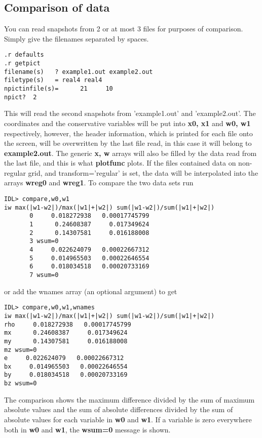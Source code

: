 \subsection{Comparison of data \label{s-compare}}

   You can read snapshots from 2 or at most 3 files for purposes of
   comparison. Simply give the filenames separated by spaces.
\begin{verbatim}
.r defaults
.r getpict
filename(s)   ? example1.out example2.out
filetype(s)   = real4 real4
npictinfile(s)=      21     10
npict?  2
\end{verbatim}
   This will read the second snapshots from 'example1.out' and
   'example2.out'. The coordinates and the conservative variables 
   will be put into {\bf x0, x1} and {\bf w0, w1} respectively, however, 
   the header information, which is printed for each file onto the screen, 
   will be overwritten by the last file read, in this case it will belong to
   {\bf example2.out}. The generic {\bf x, w} arrays will also be
   filled by the data read from the last file, and this is what 
   {\bf plotfunc} plots. If the files contained data on non-regular grid,
   and transform='regular' is set, the data will be interpolated into 
   the arrays {\bf wreg0} and {\bf wreg1}. 
   To compare the two data sets run
\begin{verbatim}
IDL> compare,w0,w1
iw max(|w1-w2|)/max(|w1|+|w2|) sum(|w1-w2|)/sum(|w1|+|w2|)
       0     0.018272938   0.00017745799
       1      0.24608387     0.017349624
       2      0.14307581     0.016188008
       3 wsum=0
       4     0.022624079   0.00022667312
       5     0.014965503   0.00022646554
       6     0.018034518   0.00020733169
       7 wsum=0
\end{verbatim}
or add the wnames array (an optional argument) to get
\begin{verbatim}
IDL> compare,w0,w1,wnames
iw max(|w1-w2|)/max(|w1|+|w2|) sum(|w1-w2|)/sum(|w1|+|w2|)
rho     0.018272938   0.00017745799
mx      0.24608387     0.017349624
my      0.14307581     0.016188008
mz wsum=0
e     0.022624079   0.00022667312
bx     0.014965503   0.00022646554
by     0.018034518   0.00020733169
bz wsum=0
\end{verbatim}
   The comparison shows the maximum difference divided by the sum of maximum 
   absolute
   values and the sum of absolute differences divided by the sum of absolute
   values for each variable in {\bf w0} and {\bf w1}. If a variable is zero
   everywhere both in {\bf w0} and {\bf w1}, the {\bf wsum=0} message is shown.
